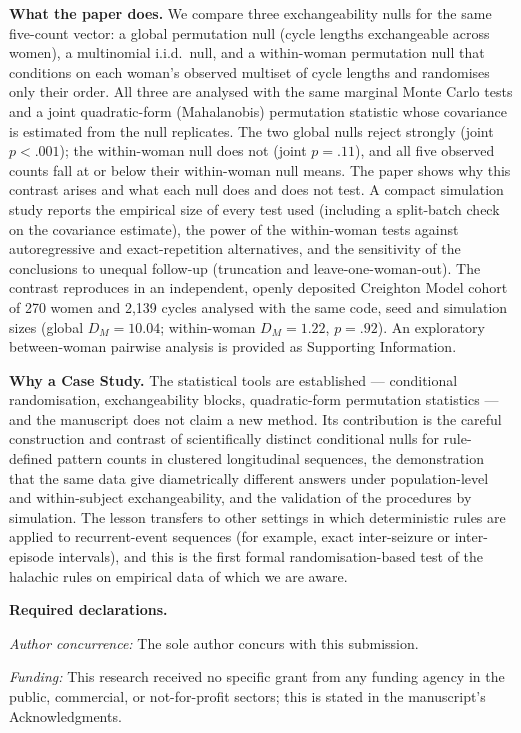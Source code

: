 \documentclass[11pt]{article}
\newcommand{\DM}{D_{M}}
\begin{document}
\medskip
\textbf{What the paper does.}
We compare three exchangeability nulls for the same five-count vector: a global
permutation null (cycle lengths exchangeable across women), a multinomial i.i.d.\ null,
and a within-woman permutation null that conditions on each woman's observed multiset of
cycle lengths and randomises only their order. All three are analysed with the same
marginal Monte Carlo tests and a joint quadratic-form (Mahalanobis) permutation statistic
whose covariance is estimated from the null replicates. The two global nulls reject
strongly (joint $p < .001$); the within-woman null does not (joint $p = .11$), and all
five observed counts fall at or below their within-woman null means. The paper shows
why this contrast arises and what each null does and does not test. A compact
simulation study reports the empirical size of every test used (including a split-batch
check on the covariance estimate), the power of the within-woman tests against
autoregressive and exact-repetition alternatives, and the sensitivity of the
conclusions to unequal follow-up (truncation and leave-one-woman-out). The contrast
reproduces in an independent, openly deposited Creighton Model cohort of 270 women and
2,139 cycles analysed with the same code, seed and simulation sizes (global $\DM = 10.04$; within-woman
$\DM = 1.22$, $p = .92$). An exploratory between-woman pairwise analysis is provided as
Supporting Information.

\medskip
\textbf{Why a Case Study.}
The statistical tools are established --- conditional randomisation, exchangeability
blocks, quadratic-form permutation statistics --- and the manuscript does not claim a
new method. Its contribution is the careful construction and contrast of scientifically
distinct conditional nulls for rule-defined pattern counts in clustered longitudinal
sequences, the demonstration that the same data give diametrically different answers
under population-level and within-subject exchangeability, and the validation of the
procedures by simulation. The lesson transfers to other settings in which deterministic
rules are applied to recurrent-event sequences (for example, exact inter-seizure or
inter-episode intervals), and this is the first formal randomisation-based test of the
halachic rules on empirical data of which we are aware.

\medskip
\textbf{Required declarations.}

\textit{Author concurrence:} The sole author concurs with this submission.

\textit{Funding:} This research received no specific grant from any funding agency in
the public, commercial, or not-for-profit sectors; this is stated in the manuscript's
Acknowledgments.
\end{document}
